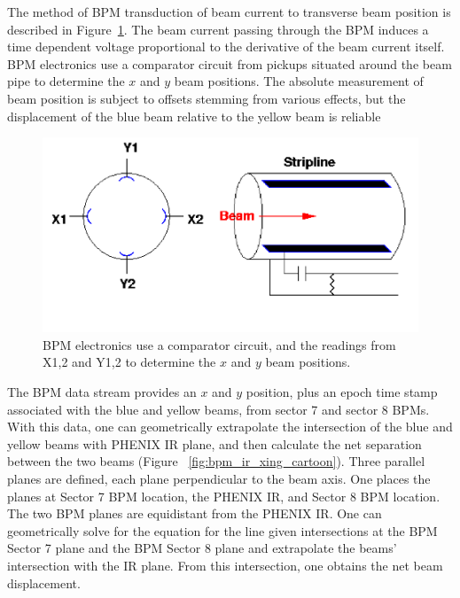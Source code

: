 The method of BPM transduction of beam current to transverse beam position is
described in Figure~\ref{fig:bpm_schematic_cartoon}. The beam current passing
through the BPM induces a time dependent voltage proportional to the derivative
of the beam current itself. BPM electronics use a comparator circuit from
pickups situated around the beam pipe to determine the $x$ and $y$ beam
positions. The absolute measurement of beam position is subject to offsets
stemming from various effects, but the displacement of the blue beam relative to
the yellow beam is reliable~\cite{KawallFocus2004}

\begin{figure}[ht]
  \begin{center}
    \includegraphics[width=1.0\linewidth]{./figures/bpm_schematic}
    \caption{ 
      BPM electronics use a comparator circuit, and the readings from X{1,2} and
      Y{1,2} to determine the $x$ and $y$ beam positions. 
    }
    \label{fig:bpm_schematic_cartoon}
  \end{center}
\end{figure}

The BPM data stream provides an $x$ and $y$ position, plus an epoch time stamp
associated with the blue and yellow beams, from sector 7 and sector 8 BPMs.
With this data, one can geometrically extrapolate the intersection of the blue
and yellow beams with PHENIX IR plane, and then calculate the net separation
between the two beams (Figure ~\ref{fig:bpm_ir_xing_cartoon}).  Three parallel
planes are defined, each plane perpendicular to the beam axis.  One places the
planes at Sector 7 BPM location, the PHENIX IR, and Sector 8 BPM location.  The
two BPM planes are equidistant from the PHENIX IR. One can geometrically solve
for the equation for the line given intersections at the BPM Sector 7 plane and
the BPM Sector 8 plane and extrapolate the beams' intersection with the IR
plane. From this intersection, one obtains the net beam displacement.

